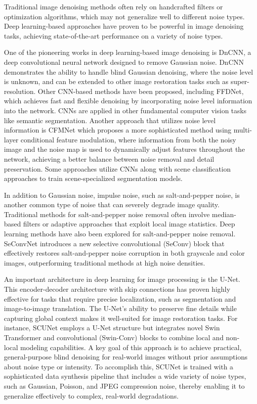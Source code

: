 Traditional image denoising methods often rely on handcrafted filters or optimization algorithms, which may not generalize well to different noise types. Deep learning-based approaches have proven to be powerful in image denoising tasks, achieving state-of-the-art performance on a variety of noise types.

One of the pioneering works in deep learning-based image denoising is DnCNN\cite{Zhang2017}, a deep convolutional neural network designed to remove Gaussian noise. DnCNN demonstrates the ability to handle blind Gaussian denoising, where the noise level is unknown, and can be extended to other image restoration tasks such as super-resolution. Other CNN-based methods have been proposed, including FFDNet\cite{Zhang2018}, which achieves fast and flexible denoising by incorporating noise level information into the network. CNNs are applied in other fundamental computer vision tasks like semantic segmentation. Another approach that utilizes noise level information is CFMNet which proposes a more sophisticated method using multi-layer conditional feature modulation, where information from both the noisy image and the noise map is used to dynamically adjust features throughout the network, achieving a better balance between noise removal and detail preservation\cite{du2020}. Some approaches utilize CNNs along with scene classification approaches to train scene-specialized segmentation models\cite{Shaaban2020}.

In addition to Gaussian noise, impulse noise, such as salt-and-pepper noise, is another common type of noise that can severely degrade image quality. Traditional methods for salt-and-pepper noise removal often involve median-based filters or adaptive approaches that exploit local image statistics\cite{Memis2021}. Deep learning methods have also been explored for salt-and-pepper noise removal. SeConvNet introduces a new selective convolutional (SeConv) block that effectively restores salt-and-pepper noise corruption in both grayscale and color images, outperforming traditional methods at high noise densities\cite{Rafiee2021}.

An important architecture in deep learning for image processing is the U-Net. This encoder-decoder architecture with skip connections has proven highly effective for tasks that require precise localization, such as segmentation and image-to-image translation. The U-Net's ability to preserve fine details while capturing global context makes it well-suited for image restoration tasks\cite{Wu2022}. For instance, SCUNet employs a U-Net structure but integrates novel Swin Transformer and convolutional (Swin-Conv) blocks to combine local and non-local modeling capabilities. A key goal of this approach is to achieve practical, general-purpose blind denoising for real-world images without prior assumptions about noise type or intensity. To accomplish this, SCUNet is trained with a sophisticated data synthesis pipeline that includes a wide variety of noise types, such as Gaussian, Poisson, and JPEG compression noise, thereby enabling it to generalize effectively to complex, real-world degradations\cite{Zhang2023}.

